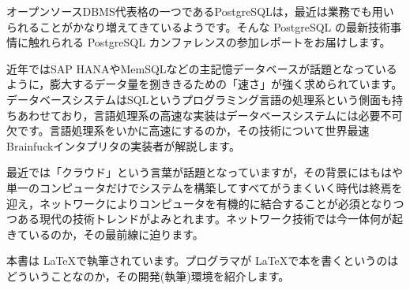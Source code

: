 オープンソースDBMS代表格の一つであるPostgreSQLは，最近は業務でも用いられることがかなり増えてきているようです。そんな PostgreSQL の最新技術事情に触れられる PostgreSQL カンファレンスの参加レポートをお届けします。

\vspace*{\Cvs}


近年ではSAP HANAやMemSQLなどの主記憶データベースが話題となっているように，膨大するデータ量を捌ききるための「速さ」が強く求められています。データベースシステムはSQLというプログラミング言語の処理系という側面も持ちあわせており，言語処理系の高速な実装はデータベースシステムには必要不可欠です。言語処理系をいかに高速にするのか，その技術について世界最速Brainfuckインタプリタの実装者が解説します。

\vspace*{\Cvs}



最近では「クラウド」という言葉が話題となっていますが，その背景にはもはや単一のコンピュータだけでシステムを構築してすべてがうまくいく時代は終焉を迎え，ネットワークによりコンピュータを有機的に結合することが必須となりつつある現代の技術トレンドがよみとれます。ネットワーク技術では今一体何が起きているのか，その最前線に迫ります。

\vspace*{\Cvs}


本書は \LaTeX で執筆されています。プログラマが \LaTeX で本を書くというのはどういうことなのか，その開発(執筆)環境を紹介します。


\thispagestyle{plainhead}
